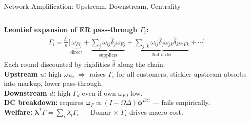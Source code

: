\documentclass[aspectratio=169, 10pt]{beamer}
\newcommand{\bom}{\bm{\omega}_F}
\begin{document}
\begin{frame}{Network Amplification: Upstream, Downstream, Centrality}

\begin{columns}[t]

{\footnotesize \textbf{Leontief expansion of ER pass-through $\Gamma_i$:}}
\vspace{-4pt}
{\scriptsize\begin{align*}
\Gamma_i = \frac{\hat\delta_i}{\kappa}\Big[
  \underbrace{\omega_{Fi}}_{\text{direct}} +
  \underbrace{\textstyle\sum_j \omega_{ij}\hat\delta_j\omega_{Fj}}_{\text{suppliers}} +
  \underbrace{\textstyle\sum_{j,k} \omega_{ij}\hat\delta_j\omega_{jk}\hat\delta_k\omega_{Fk}}_{\text{2nd order}} + \cdots\Big]
\end{align*}}
\vspace{0pt}
{\footnotesize Each round discounted by rigidities $\hat\delta$ along the chain.\\[5pt]


\textbf{Upstream $u$:} high $\omega_{Fu}$ $\Rightarrow$ raises $\Gamma_i$ for all customers; stickier upstream absorbs into markup, lower pass-through.\\[2pt]
\textbf{Downstream $d$:} high $\Gamma_d$ even if own $\omega_{Fd}$ low.\\[2pt]
\textbf{DC breakdown:} requires $\bom \propto (I{-}\Omega\Delta)\bm{\phi}^{DC}$ --- fails empirically.\\[2pt]
\textbf{Welfare:} $\bm{\lambda}^T\Gamma = \sum_i\lambda_i\Gamma_i$ --- Domar $\times$ $\Gamma_i$ drives macro cost.}



\end{columns}
\end{frame}
\end{document}
